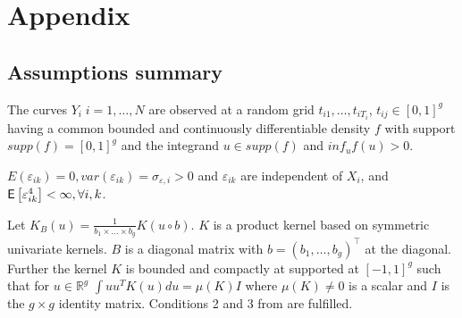 \section{Appendix}%
\subsection{Assumptions summary}
\label{assum}
\begin{assumptions}
\label{A1}
The curves $Y_i \; i=1,\dots,N$ are observed at a random grid $t_{i1},\dots,t_{iT_i}$, $t_{ij}\in [0,1]^g$ having a common bounded and continuously differentiable density $f$ with support $supp(f)=[0,1]^g$ and the integrand $u \in supp(f)$ and $inf_u f(u)>0$. 
\end{assumptions} 
\begin{assumptions}  
\label{A2}
$E(\varepsilon_{ik})=0,var(\varepsilon_{ik})=\sigma_{\varepsilon,i}>0$ and $\varepsilon_{ik}$ are independent of $X_i$, and $\mathop{\mbox{\sf E}}\left[\varepsilon_{ik}^4\right]<\infty, \forall i,k$. %
\end{assumptions}
\begin{assumptions}
\label{A3}
Let $K_B(u)=\frac{1}{b_1 \times \dots \times b_g} K(u \circ b)$. $K$ is a product kernel based on symmetric univariate kernels. $B$ is a diagonal matrix with $b=(b_1,\dots,b_g)^{\top}$ at the diagonal.   Further the kernel $K$ is bounded and compactly at supported at $[-1,1]^g$ such that for $u \in \mathbb{R}^g$ $\int u u^T K(u) du = \mu(K) I$ where $\mu(K)\neq 0$ is a scalar and $I$ is the $g \times g$ identity matrix. Conditions 2 and 3 from \cite{Masry96} are fulfilled.
\end{assumptions}
